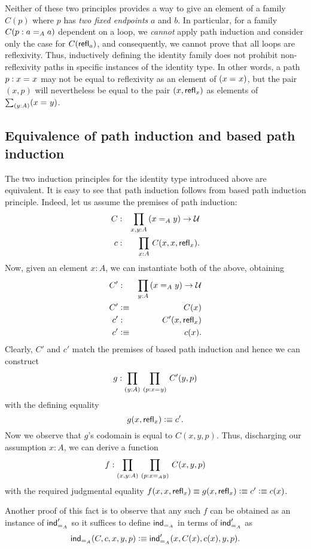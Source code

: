 \begin{rmk}
Neither of these two principles provides a way to give an element of a family $C(p)$ where $p$ has \emph{two fixed endpoints} $a$ and $b$.  In particular, for a family $C(p : \id[A]{a}{a})$ dependent on a loop, we \emph{cannot} apply path induction and consider only the case for $C(\refl{a})$, and consequently, we cannot prove
that all loops are reflexivity.  Thus, inductively defining the identity family does not prohibit non-reflexivity paths in specific instances of the identity type.
In other words, a path $p:\id{x}{x}$ may not be equal to reflexivity as an element of $(\id{x}{x})$, but the pair $(x,p)$ will nevertheless be equal to the pair $(x,\refl{x})$ as elements of $\sm{y:A}(\id{x}{y})$.
\end{rmk}

\subsection{Equivalence of path induction and based path induction}

The two induction principles for the identity type introduced above are equivalent.
It is easy to see that path induction follows from based path induction principle.
Indeed, let us assume the premises of path induction:
\begin{eqnarray*}
C & : & \prd{x,y:A}(\id[A]{x}{y}) \to \UU  \\
c & :  & \prd{x:A} C(x,x,\refl{x}).
\end{eqnarray*}
Now, given an element $x:A$, we can instantiate both of the above, obtaining
\begin{eqnarray*}
C' & : & \prd{y:A} (\id[A]{x}{y}) \to \UU  \\
C' & \defeq & C(x) \\
c' & : & C'(x,\refl{x}) \\
c' & \defeq & c(x).
\end{eqnarray*}
Clearly, $C'$ and $c'$ match the premises of based path induction and hence we can construct 
\begin{eqnarray*}
g : \prd{y:A}{p : \id{x}{y}} C'(y,p)
\end{eqnarray*}
with the defining equality
\[ g(x,\refl{x}) \defeq c' .\]
Now we observe that $g$'s codomain is equal to $C(x,y,p)$.
Thus, discharging our assumption $x:A$, we can derive a function 
\[ f : \prd{x,y:A}{p : \id[A]{x}{y}} C(x,y,p) \]
with the required judgmental equality $f(x,x,\refl{x}) \judgeq g(x,\refl{x}) \defeq c' \defeq c(x)$.

Another proof of this fact is to observe that any such $f$ can be obtained as an instance of $\indidb{A}$
so it suffices to define $\indid{A}$ in terms of $\indidb{A}$ as
\[ \indid{A}(C,c,x,y,p) \defeq \indidb{A}(x,C(x),c(x),y,p). \]

